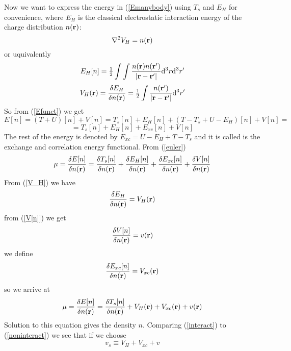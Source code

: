 Now we want to express the energy in (\ref{Emanybody}) using $T_s$ and $E_H$ for convenience, where $E_H$ is the classical electrostatic interaction energy of the charge distribution $n({\bf r})$: 
\begin{equation*}
  \nabla^2 V_H=n({\bf r})
\end{equation*}
or uquivalently 
\begin{equation*}
  E_H[n]={\textstyle{1\over2}}\int\int {n({\bf r})n({\bf r'})\over|{\bf r}-{\bf r'}|} {\rm d}^3r{\rm d}^3r'
\end{equation*}
\begin{equation}
  V_H({\bf r})={\delta E_H\over\delta n({\bf r})}={\textstyle{1\over2}}\int {n({\bf r'})\over|{\bf r}-{\bf r'}|} {\rm d}^3r'  \label{V_H}
\end{equation}
So from (\ref{Efunct}) we get 
\begin{equation*}
  E[n]=(T+U)[n]+V[n]=T_s[n]+E_H[n]+(T-T_s+U-E_H)[n]+V[n]=
\end{equation*}
\begin{equation}
  =T_s[n]+E_H[n]+E_{xc}[n]+V[n]  \label{Efunctxc}
\end{equation}
The rest of the energy is denoted by $E_{xc}=U-E_H+T-T_s$ and it is called is the exchange and correlation energy functional. From (\ref{euler})
\begin{equation*}
  \mu={\delta E[n]\over\delta n({\bf r})}= {\delta T_s[n]\over\delta n({\bf r})}+ {\delta E_H[n]\over\delta n({\bf r})}+ {\delta E_{xc}[n]\over\delta n({\bf r})}+ {\delta V[n]\over\delta n({\bf r})}
\end{equation*}
From (\ref{V_H}) we have 
\begin{equation*}
  {\delta E_H\over\delta n({\bf r})}=V_H({\bf r})
\end{equation*}
from (\ref{V[n]}) we get 
\begin{equation*}
  {\delta V[n]\over\delta n({\bf r})}=v({\bf r})
\end{equation*}
we define 
\begin{equation}
  {\delta E_{xc}[n]\over\delta n({\bf r})}=V_{xc}({\bf r})  \label{Vxcpot}
\end{equation}
so we arrive at 
\begin{equation}
  \mu={\delta E[n]\over\delta n({\bf r})}= {\delta T_s[n]\over\delta n({\bf r})}+V_H({\bf r})+V_{xc}({\bf r})+v({\bf r})  \label{interact}
\end{equation}
Solution to this equation gives the density $n$. Comparing (\ref{interact}) to (\ref{noninteract}) we see that if we choose 
\begin{equation*}
  v_s\equiv V_H+V_{xc}+v
\end{equation*}
